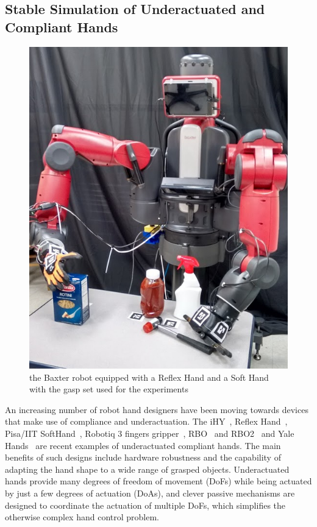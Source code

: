 \subsection{Stable Simulation of Underactuated and Compliant Hands}
\begin{figure}[!hbt]
\begin{center}
        \includegraphics[width=0.75\columnwidth]     {images/ssoch/baxter_HDR}
        \caption{the Baxter robot equipped with a Reflex Hand and a Soft Hand with the gasp set used for the experiments}
        \label{fig:baxter}
        \end{center}
\end{figure}
An increasing number of robot hand designers have been moving towards devices that make use of compliance and underactuation. The iHY~\cite{Odhner14}, Reflex Hand~\cite{ReflexHand}, Pisa/IIT SoftHand~\cite{Catalano14}, Robotiq 3 fingers gripper~\cite{Robotiq3Finger}, RBO~\cite{Deimel13} and RBO2~\cite{Deimel14} and Yale Hands~\cite{Ma13} are recent examples of underactuated compliant hands. The main benefits of such designs include hardware robustness and the capability of adapting the hand shape to a wide range of grasped objects. Underactuated hands provide many degrees of freedom of movement (DoFs) while being actuated by just a few degrees of actuation (DoAs), and clever passive mechanisms are designed to coordinate the actuation of multiple DoFs, which simplifies the otherwise complex hand control problem. %
